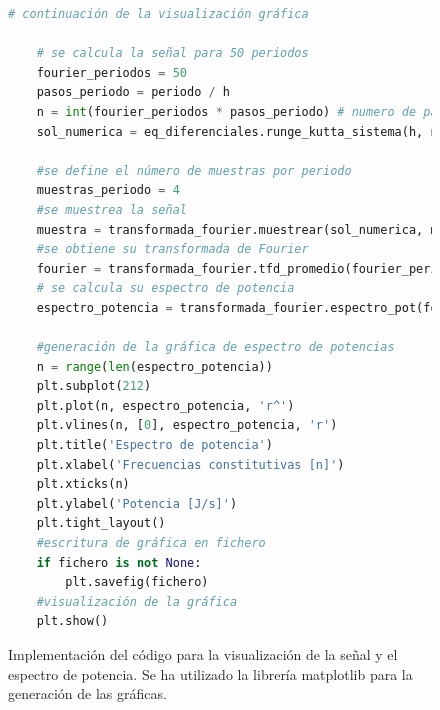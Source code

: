 \documentclass[11pt]{article}
\begin{document}
\begin{figure}
\begin{lstlisting}[language=Python]
	# continuación de la visualización gráfica

	# se calcula la señal para 50 periodos
	fourier_periodos = 50
	pasos_periodo = periodo / h
	n = int(fourier_periodos * pasos_periodo) # numero de pasos de integración para muestrear fourier_periodos
	sol_numerica = eq_diferenciales.runge_kutta_sistema(h, n, f, g, x_0, y_0, t_0)

	#se define el número de muestras por periodo
	muestras_periodo = 4
	#se muestrea la señal
	muestra = transformada_fourier.muestrear(sol_numerica, muestras_periodo, pasos_periodo)
	#se obtiene su transformada de Fourier
	fourier = transformada_fourier.tfd_promedio(fourier_periodos, muestras_periodo, muestra)
	# se calcula su espectro de potencia
	espectro_potencia = transformada_fourier.espectro_pot(fourier)

	#generación de la gráfica de espectro de potencias
	n = range(len(espectro_potencia))
	plt.subplot(212)
	plt.plot(n, espectro_potencia, 'r^')
	plt.vlines(n, [0], espectro_potencia, 'r')
	plt.title('Espectro de potencia')
	plt.xlabel('Frecuencias constitutivas [n]')
	plt.xticks(n)
	plt.ylabel('Potencia [J/s]')
	plt.tight_layout()
	#escritura de gráfica en fichero
	if fichero is not None:
		plt.savefig(fichero)
	#visualización de la gráfica
	plt.show()
\end{lstlisting}
\caption{Implementación del código para la visualización de la señal y el espectro de potencia.
Se ha utilizado la librería matplotlib para la generación de las gráficas.}
\end{figure}
\end{document}
